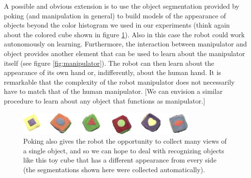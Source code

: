 A possible and obvious extension is to use the object segmentation provided 
by poking (and manipulation in general) to build models of the appearance of objects 
beyond the color histogram we used in our experiments (think again about the
colored cube shown in figure \ref{fig:sample-results}).
Also in this case the robot could work autonomously on learning. Furthermore, the
interaction between manipulator and object provides another element that can
be used to learn about the manipulator itself (see figure \ref{fig:manipulator}). 
The robot can then learn about the appearance of its own hand or, 
indifferently, about the human hand. It is 
remarkable that the complexity of the robot manipulator does not necessarily have to
match that of the human manipulator. [We can envision a similar procedure to learn about 
any object that functions as manipulator.]

\begin{figure}[tbh]
  \centerline{\includegraphics[width=9cm]{fig-cube-segmentations}}
  \caption{
%
Poking also gives the robot the opportunity
to collect many views of a single object, and so we can hope to deal
with recognizing objects like this toy cube
that has a different appearance from every side (the segmentations
shown here were collected automatically).
%
}
  \label{fig:sample-results}
\end{figure}







